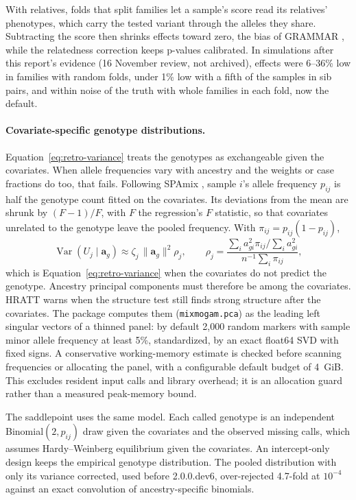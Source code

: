 \documentclass[11pt]{article}
\newcommand{\Var}{\operatorname{Var}}
\newcommand{\code}[1]{\texttt{#1}}
\begin{document}
With relatives, folds that split families let a sample's score read its
relatives' phenotypes, which carry the tested variant through the alleles
they share. Subtracting the score then shrinks effects toward zero, the
bias of GRAMMAR \citep{aulchenko2007}, while the relatedness correction
keeps p-values calibrated. In simulations after this report's evidence
(16 November review, not archived), effects were 6--36\% low in families
with random folds, under 1\% low with a fifth of the samples in sib
pairs, and within noise of the truth with whole families in each fold, now
the default.

\paragraph{Covariate-specific genotype distributions.}
Equation~\eqref{eq:retro-variance} treats the genotypes as exchangeable
given the covariates. When allele frequencies vary with ancestry and the
weights or case fractions do too, that fails. Following SPAmix
\citep{ma2025}, sample $i$'s allele frequency $p_{ij}$ is half the
genotype count fitted on the covariates. Its deviations from the mean are
shrunk by $(F-1)/F$, with $F$ the regression's $F$ statistic, so that
covariates unrelated to the genotype leave the pooled frequency.
With $\pi_{ij}=p_{ij}(1-p_{ij})$,
\begin{equation}
 \Var(U_j\mid\mathbf a_g)\approx\zeta_j\,\|\mathbf a_g\|^2\rho_j,
 \qquad
 \rho_j=\frac{\sum_i a_{gi}^2\pi_{ij}/\sum_ia_{gi}^2}{n^{-1}\sum_i\pi_{ij}} ,
 \label{eq:retro-variance-rho}
\end{equation}
which is Equation~\eqref{eq:retro-variance} when the covariates do not
predict the genotype. Ancestry principal components must therefore be
among the covariates. HRATT warns when the structure test still finds
strong structure after the covariates. The package computes them
(\code{mixmogam.pca}) as the leading left singular vectors of a thinned
panel: by default 2,000 random markers with sample minor allele frequency
at least 5\%, standardized, by an exact float64 SVD with fixed signs.
A conservative working-memory estimate is checked before scanning
frequencies or allocating the panel, with a configurable default budget
of 4~GiB. This excludes resident input calls and library overhead;
it is an allocation guard rather than a measured peak-memory bound.

The saddlepoint uses the same model. Each called genotype is an
independent Binomial$(2,p_{ij})$ draw given the covariates and the observed
missing calls, which assumes Hardy--Weinberg equilibrium given the
covariates. An intercept-only design keeps the empirical genotype
distribution. The pooled distribution with only its variance corrected,
used before 2.0.0.dev6, over-rejected 4.7-fold at $10^{-4}$ against an
exact convolution of ancestry-specific binomials.
\end{document}

